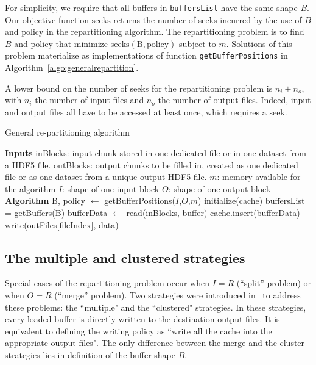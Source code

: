 \documentclass[conference]{IEEEtran}
\begin{document}
For simplicity, we require that all buffers in \texttt{buffersList} have
the same shape $B$. Our objective function
$\mathrm{seeks}$ returns the number of seeks incurred by the use of
$B$ and $\mathrm{policy}$ in the repartitioning algorithm. The
repartitioning problem is to find $B$ and $\mathrm{policy}$ that minimize
$\mathrm{seeks(B, policy)}$ subject to $m$. Solutions of this problem materialize as
implementations of function \texttt{getBufferPositions} in
Algorithm~\ref{algo:generalrepartition}.

A lower bound on the number of seeks for the repartitioning problem is
$n_i + n_o$, with $n_i$ the number of input files and $n_o$ the number of output
files. Indeed, input and output files all have to be accessed at least once,
which requires a seek.

\begin{algorithm}
  \caption{General re-partitioning algorithm}
  \label{algo:generalrepartition}
  \begin{algorithmic}[1]
    \STATE \textbf{Inputs}
    \STATE inBlocks: input chunk stored in one dedicated file or in one dataset from a HDF5 file.
    \STATE outBlocks: output chunks to be filled in, created as one dedicated file or as one dataset from a unique output HDF5 file.
    \STATE $m$: memory available for the algorithm
    \STATE $I$: shape of one input block
    \STATE $O$: shape of one output block
    \STATE
    \STATE \textbf{Algorithm}
    \STATE B, policy $\leftarrow$ getBufferPositions($I$,$O$,$m$)
    \STATE initialize(cache)
    \STATE buffersList = getBuffers(B)
      \STATE bufferData $\leftarrow$ read(inBlocks, buffer)
      \STATE cache.insert(bufferData)
        \STATE write(outFiles[fileIndex], data)
      \ENDFOR
    \ENDFOR

  \end{algorithmic}
\end{algorithm}

\subsection{The multiple and clustered strategies}
Special cases of the repartitioning problem occur when $I=R$ (``split'' problem)
or when $O=R$ (``merge'' problem). Two strategies were introduced
in~\cite{seqalgorithms} to address these problems: the ``multiple" and the
``clustered" strategies. In these strategies, every loaded buffer is directly written to the
destination output files. It is equivalent to defining the writing policy
as ``write all the cache into the appropriate output files". The only difference
between the merge and the cluster strategies lies in definition of the buffer shape $B$.
\end{document}
